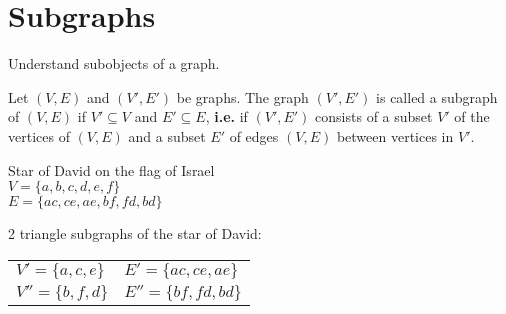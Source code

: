 \documentclass[10pt]{article}
\begin{document}
	\section{Subgraphs}
	\begin{description}
		\item[Task:] Understand subobjects of a graph.
		\item[Definition:] Let $(V, E)$ and $(V', E')$ be graphs. The graph $(V', E')$ is called a subgraph of $(V, E)$ if $V' \subseteq V$ and $E' \subseteq E$, \textbf{i.e.} if $(V', E')$ consists of a subset $V'$ of the vertices of $(V, E)$ and a subset $E'$ of edges $(V, E)$ between vertices in $V'$.
		\item[Example:] Star of David on the flag of Israel \\
			$V = \{a, b, c, d, e, f\}$ \\
			$E = \{ac, ce, ae, bf, fd, bd\}$ \\
			\begin{figure}[h!]
				\centering
		\end{figure}
		\item 2 triangle subgraphs of the star of David: \\
		\begin{tabular}{ll}
				$V' = \{a, c, e\}$ & $E' = \{ac, ce, ae\}$ \\
				$V'' = \{b, f, d\}$ & $E'' = \{bf, fd, bd\}$
		\end{tabular}
	\end{description}
	
\end{document}
